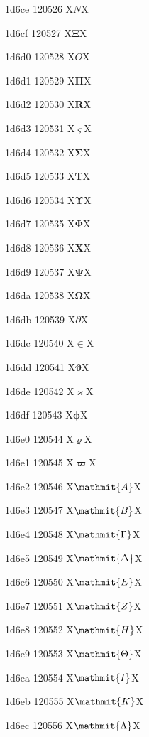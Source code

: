 \documentclass[11pt]{article}
\begin{document}
1d6ce 120526 X{\ensuremath{N}}X

1d6cf 120527 X{\ensuremath{\mathbf{\Xi}}}X

1d6d0 120528 X{\ensuremath{O}}X

1d6d1 120529 X{\ensuremath{\mathbf{\Pi}}}X

1d6d2 120530 X{\ensuremath{\mathbf{R}}}X

1d6d3 120531 X{\ensuremath{\mathbf{\varsigma}}}X

1d6d4 120532 X{\ensuremath{\mathbf{\Sigma}}}X

1d6d5 120533 X{\ensuremath{\mathbf{T}}}X

1d6d6 120534 X{\ensuremath{\mathbf{\Upsilon}}}X

1d6d7 120535 X{\ensuremath{\mathbf{\Phi}}}X

1d6d8 120536 X{\ensuremath{\mathbf{X}}}X

1d6d9 120537 X{\ensuremath{\mathbf{\Psi}}}X

1d6da 120538 X{\ensuremath{\mathbf{\Omega}}}X

1d6db 120539 X{\ensuremath{\partial}}X

1d6dc 120540 X{\ensuremath{\in}}X

1d6dd 120541 X{\ensuremath{\mathbf{\vartheta}}}X

1d6de 120542 X{\ensuremath{\mathbf{\varkappa}}}X

1d6df 120543 X{\ensuremath{\mathbf{\phi}}}X

1d6e0 120544 X{\ensuremath{\mathbf{\varrho}}}X

1d6e1 120545 X{\ensuremath{\mathbf{\varpi}}}X

1d6e2 120546 X{\ensuremath{\mathmit{A}}}X

1d6e3 120547 X{\ensuremath{\mathmit{B}}}X

1d6e4 120548 X{\ensuremath{\mathmit{\Gamma}}}X

1d6e5 120549 X{\ensuremath{\mathmit{\Delta}}}X

1d6e6 120550 X{\ensuremath{\mathmit{E}}}X

1d6e7 120551 X{\ensuremath{\mathmit{Z}}}X

1d6e8 120552 X{\ensuremath{\mathmit{H}}}X

1d6e9 120553 X{\ensuremath{\mathmit{\Theta}}}X

1d6ea 120554 X{\ensuremath{\mathmit{I}}}X

1d6eb 120555 X{\ensuremath{\mathmit{K}}}X

1d6ec 120556 X{\ensuremath{\mathmit{\Lambda}}}X
\end{document}
